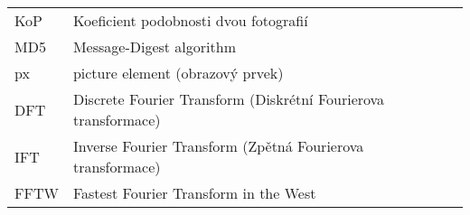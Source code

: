 
\seznamzkr

\begin{tabular}{ll}
  KoP	& Koeficient podobnosti dvou fotografií								\\
  MD5	& Message-Digest algorithm											\\
  px	& picture element (obrazový prvek)									\\
  DFT	& Discrete Fourier Transform (Diskrétní Fourierova transformace)	\\
  IFT	& Inverse Fourier Transform (Zpětná Fourierova transformace)	\\
  FFTW	& Fastest Fourier Transform in the West \\
\end{tabular}


